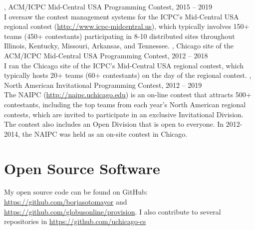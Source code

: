 \documentclass{resume}
\begin{document}
\begin{category}{}
, ACM/ICPC Mid-Central USA Programming Contest, 2015 -- 2019\\
I oversaw the contest management systems for the ICPC's Mid-Central USA regional contest (\url{http://www.icpc-midcentral.us}), which typically involves 150+ teams (450+ contestants) participating in 8-10 distributed sites throughout Illinois, Kentucky, Missouri, Arkansas, and Tennessee.
, Chicago site of the ACM/ICPC Mid-Central USA Programming Contest, 2012 -- 2018\\
I ran the Chicago site of the ICPC's Mid-Central USA regional contest, which typically hosts 20+ teams (60+ contestants) on the day of the regional contest.
, North American Invitational Programming Contest, 2012 -- 2019\\
The NAIPC (\url{http://naipc.uchicago.edu}) is an on-line contest that attracts 500+ contestants, including the top teams from each year's North American regional contests, which are invited to participate in an exclusive Invitational Division. The contest also includes an Open Division that is open to everyone. In 2012-2014, the NAIPC was held as an on-site contest in Chicago.
\end{category}


\section*{\hspace{-1cm}Open Source Software}

My open source code can be found on GitHub: \url{https://github.com/borjasotomayor} and \url{https://github.com/globusonline/provision}. I also contribute to several repositories in \url{https://github.com/uchicago-cs}
\end{document}
